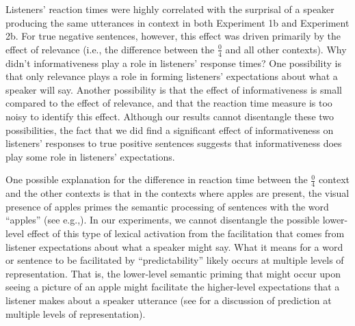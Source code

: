 \documentclass[man, floatsintext, noapacite]{apa6}
\begin{document}

Listeners' reaction times were highly correlated with the surprisal of a speaker producing the same utterances in context in both Experiment 1b and Experiment 2b. For true negative sentences, however, this effect was driven primarily by the effect of relevance (i.e., the difference between the $\frac{0}{4}$ and all other contexts). Why didn't informativeness play a role in listeners' response times? One possibility is that only relevance plays a role in forming listeners' expectations about what a speaker will say. Another possibility is that the effect of informativeness is small compared to the effect of relevance, and that the reaction time measure is too noisy to identify this effect. Although our results cannot disentangle these two possibilities, the fact that we did find a significant effect of informativeness on listeners' responses to true positive sentences suggests that informativeness does play some role in listeners' expectations. 

One possible explanation for the difference in reaction time between the $\frac{0}{4}$ context and the other contexts is that in the contexts where apples are present, the visual presence of apples primes the semantic processing of sentences with the word ``apples'' (see e.g.,). In our experiments, we cannot disentangle the possible lower-level effect of this type of lexical activation from the facilitation that comes from listener expectations about what a speaker might say. What it means for a word or sentence to be facilitated by ``predictability'' likely occurs at multiple levels of representation. That is, the lower-level semantic priming that might occur upon seeing a picture of an apple might facilitate the higher-level expectations that a listener makes about a speaker utterance (see  for a discussion of prediction at multiple levels of representation). 
\end{document}
